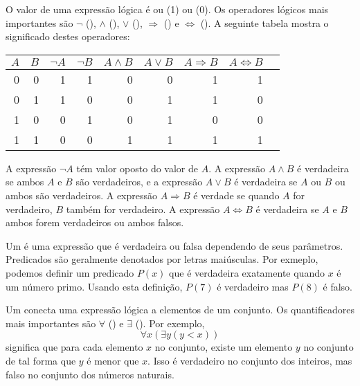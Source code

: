 
O valor de uma expressão lógica é ou
 (1) ou  (0).
Os operadores lógicos mais importantes são
$\lnot$ (),
$\land$ (),
$\lor$ (),
$\Rightarrow$ () e
$\Leftrightarrow$ ().
A seguinte tabela mostra o significado destes operadores:

\begin{center}
\begin{tabular}{rr|rrrrrrr}
$A$ & $B$ & $\lnot A$ & $\lnot B$ & $A \land B$ & $A \lor B$ & $A \Rightarrow B$ & $A \Leftrightarrow B$ \\
\hline
0 & 0 & 1 & 1 & 0 & 0 & 1 & 1 \\
0 & 1 & 1 & 0 & 0 & 1 & 1 & 0 \\
1 & 0 & 0 & 1 & 0 & 1 & 0 & 0 \\
1 & 1 & 0 & 0 & 1 & 1 & 1 & 1 \\
\end{tabular}
\end{center}

A expressão $\lnot A$ tém valor oposto do valor de $A$.
A expressão $A \land B$ é verdadeira se ambos $A$ e $B$
são verdadeiros,
e a expressão $A \lor B$ é verdadeira se $A$ ou $B$ ou ambos
são verdadeiros.
A expressão $A \Rightarrow B$ é verdade se quando $A$ for verdadeiro,
$B$ também for verdadeiro.
A expressão $A \Leftrightarrow B$ é verdadeira se $A$ e $B$ ambos forem verdadeiros ou ambos falsos.


Um  é uma expressão que é verdadeira ou falsa
dependendo de seus parâmetros.
Predicados são geralmente denotados por letras maiúsculas.
Por exmeplo, podemos definir um predicado $P(x)$
que é verdadeira exatamente quando $x$ é um número primo.
Usando esta definição, $P(7)$ é verdadeiro mas $P(8)$ é falso.


Um  conecta uma expressão lógica
a elementos de um conjunto.
Os quantificadores mais importantes são
$\forall$ () e $\exists$ ().
Por exemplo,
\[\forall x (\exists y (y < x))\]
significa que para cada elemento $x$ no conjunto,
existe um elemento $y$ no conjunto
de tal forma que $y$ é menor que $x$.
Isso é verdadeiro no conjunto dos inteiros,
mas falso no conjunto dos números naturais.

